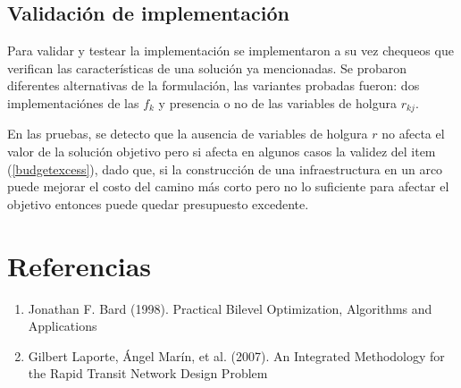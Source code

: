 \documentclass{article}
\begin{document}
  \subsection*{Validación de implementación}

  Para validar y testear la implementación se implementaron a su vez chequeos que verifican las características de una solución ya mencionadas. Se probaron diferentes alternativas de la formulación, las variantes probadas fueron: dos implementaciónes de las $f_k$ y presencia o no de las variables de holgura $r_{kj}$.

  En las pruebas, se detecto que la ausencia de variables de holgura $r$ no afecta el valor de la solución objetivo pero si afecta en algunos casos la validez del item (\ref{budgetexcess}), dado que, si la construcción de una infraestructura en un arco puede mejorar el costo del camino más corto pero no lo suficiente para afectar el objetivo entonces puede quedar presupuesto excedente.

  \section*{Referencias}

  \begin{enumerate}
    \item{\label{bardbook} Jonathan F. Bard (1998). Practical Bilevel Optimization, Algorithms and Applications}
    \item{\label{laporte2007} Gilbert Laporte, Ángel Marín, et al. (2007). An Integrated Methodology for the Rapid
    Transit Network Design Problem}
  \end{enumerate}
\end{document}
